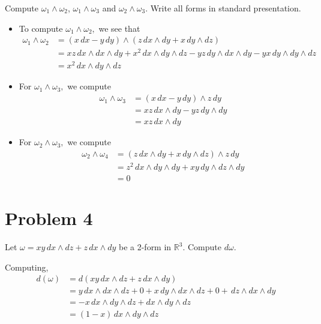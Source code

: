 \documentclass[11pt]{article}
\begin{document}
Compute $\omega_1 \wedge \omega_2$, $\omega_1 \wedge \omega_3$ and $\omega_2 \wedge \omega_3$. Write all forms in standard presentation.
\begin{solution}
    \begin{itemize}
        \item To compute $\omega_1 \wedge \omega_2,$ we see that 
\begin{align*}
    \omega_1 \wedge \omega_2 &= (x \, dx - y \, dy )\wedge ( z \, dx \wedge dy + x \, dy \wedge dz)\\
    &= xz\, dx \wedge dx \wedge dy+ x^2 \, dx \wedge dy\wedge dz - yz \,dy \wedge dx \wedge dy - yx \, dy \wedge dy\wedge dz\\
    &= \boxed{x^2 \,dx\wedge dy\wedge dz}
\end{align*}
\item For $\omega_1 \wedge \omega_3,$ we compute
\begin{align*}
    \omega_1 \wedge \omega_3 &= (x\, dx - y \, dy) \wedge z\, dy\\
    &= xz \, dx \wedge dy - yz\, dy \wedge dy\\
    &= \boxed{xz \, dx \wedge dy}
\end{align*}
\item For $\omega_2 \wedge \omega_3,$ we compute
\begin{align*}
    \omega_2 \wedge \omega_4 &= (z\, dx \wedge dy  + x\,dy \wedge dz) \wedge z\,dy\\
    &= z^2\, dx \wedge dy\wedge dy + xy\, dy \wedge dz \wedge dy\\
    &= \boxed{0}
\end{align*}
    \end{itemize}
\end{solution}



\newpage

\section*{Problem 4}

Let $\omega = xy \, dx \wedge dz + z \, dx \wedge dy$ be a 2-form in $\mathbb{R}^3$. Compute $d\omega$.
\begin{solution}
    Computing, 
    \begin{align*}
        d(\omega) &= d\left(xy \, dx \wedge dz + z \,dx \wedge dy\right)\\
        &= y\,dx \wedge dx\wedge dz + 0 + x\,dy\wedge dx\wedge dz + 0 + \,dz \wedge dx \wedge dy\\
        &= -x \,dx \wedge dy \wedge dz + dx \wedge dy \wedge dz\\
        &= (1-x)\,dx \wedge dy \wedge dz
    \end{align*}
\end{solution}
\newpage
\end{document}
